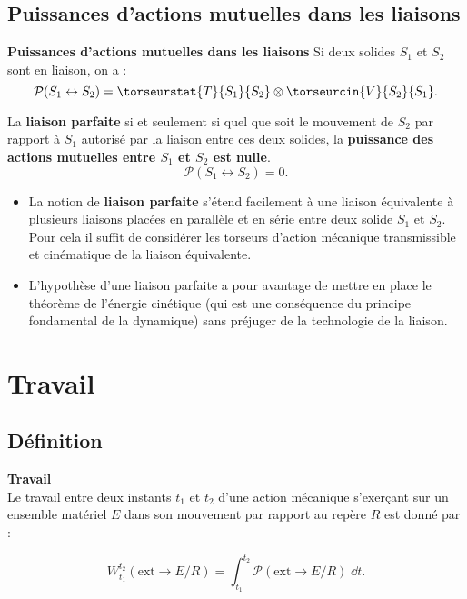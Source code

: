 \subsection{Puissances d'actions mutuelles dans les liaisons}
\begin{defi}\textbf{Puissances d'actions mutuelles dans les liaisons}
Si deux solides $S_1$ et $S_2$ sont en liaison, on a :
$$
\mathcal{P}(S_1 \leftrightarrow S_2) = \torseurstat{T}{S_1}{S_2}\otimes \torseurcin{V}{S_2}{S_1}.
$$

La \textbf{liaison parfaite} si et seulement si quel que soit le mouvement de $S_2$ par rapport à $S_1$ autorisé par la liaison entre ces deux solides, la \textbf{puissance des actions mutuelles entre $S_1$ et $S_2$ est nulle}.
$$
\mathcal{P}(S_1 \leftrightarrow S_2)=0.
$$
\end{defi}


\begin{rem}%
\begin{itemize}
\item La notion de \textbf{liaison parfaite} s'étend facilement à une liaison équivalente à plusieurs liaisons placées en parallèle et en série entre deux solide $S_1$ et $S_2$. Pour cela il suffit de considérer les torseurs d'action mécanique transmissible et cinématique de la liaison équivalente.
\item L'hypothèse d'une liaison parfaite a pour avantage de mettre en place le théorème de l'énergie cinétique (qui est une conséquence du principe fondamental de la dynamique) sans préjuger de la technologie de la liaison.
\end{itemize}
\end{rem}%


\section{Travail}
\subsection{Définition}
\begin{defi}\textbf{Travail}\\
Le travail entre deux instants $t_1$ et $t_2$ d'une action mécanique s'exerçant sur un ensemble matériel $E$ dans son mouvement par rapport au repère $R$ est donné par :

$$
\displaystyle{W^{t_2}_{t_1}}(\text{ext} \rightarrow E/R)=\displaystyle{\int_{t_1}^{t_2}}\mathcal{P}(\text{ext} \rightarrow E/R)\;\dd t.
$$
\end{defi}

